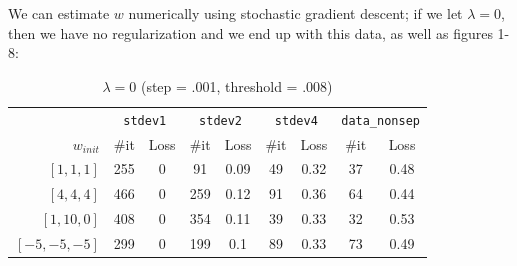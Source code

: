 \documentclass[10pt,letterpaper]{article}
\begin{document}
We can estimate $w$ numerically using stochastic gradient descent; if we let $\lambda = 0$, then we have no regularization and we end up with this data, as well as figures 1-8:
\begin{table}[h]
\centering
\caption{$\lambda=0$ (step = .001, threshold = .008)}
\begin{tabular}{r|cc|cc|cc|cc}
   & \multicolumn{2}{|c}{\texttt{stdev1}} & \multicolumn{2}{|c}{\texttt{stdev2}} & \multicolumn{2}{|c}{\texttt{stdev4}} & \multicolumn{2}{|c}{\texttt{data\_nonsep}}\\
$w_{init}$& \#it         & Loss        & \#it   & Loss &
\#it   & Loss           & \#it        & Loss      \\\hline
$[1, 1, 1]$  & 255           &    0        & 91      & 0.09             & 49    & 0.32           & 37            & 0.48        \\
$[4, 4, 4]$  & 466           & 0         & 259     & 0.12             & 91      & 0.36            & 64           & 0.44      \\
$[1, 10, 0]$ & 408           &  0         & 354      & 0.11              &  39     & 0.33           & 32            & 0.53      \\
$[-5, -5, -5]$ & 299         &  0        & 199     & 0.1               &  89     & 0.33            & 73           & 0.49    
\end{tabular}
\end{table}
\end{document}
